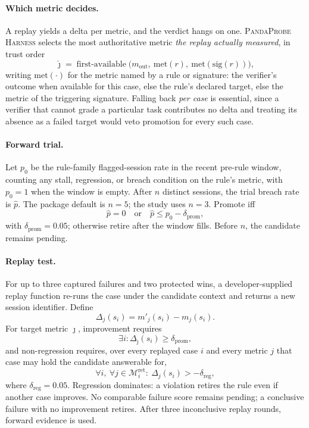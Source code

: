 \documentclass[11pt,letterpaper]{article}
\newcommand{\dpromote}{\delta_{\mathrm{prom}}}
\newcommand{\dregress}{\delta_{\mathrm{reg}}}
\newcommand{\Harness}{\textsc{PandaProbe Harness}\xspace}
\newcommand{\Mset}{\mathcal{M}}
\newcommand{\outcome}{m_{\mathrm{out}}}
\begin{document}
\paragraph{Which metric decides.}
A replay yields a delta per metric, and the verdict hangs on one. \Harness selects the most
authoritative metric \emph{the replay actually measured}, in trust order
\begin{equation}
 \hat\jmath=\operatorname{first-available}\bigl(\outcome,\ \mathrm{met}(r),\
 \mathrm{met}(\mathrm{sig}(r))\bigr),
 \label{eq:target}
\end{equation}
writing $\mathrm{met}(\cdot)$ for the metric named by a rule or signature: the verifier's outcome
when available for this case, else the rule's declared target, else the metric of the triggering
signature. Falling back \emph{per case} is essential, since a verifier that cannot grade a
particular task contributes no delta and treating its absence as a failed target would veto
promotion for every such case.

\paragraph{Forward trial.}
Let $p_0$ be the rule-family flagged-session rate in the recent pre-rule window, counting any
stall, regression, or breach condition on the rule's metric, with $p_0{=}1$ when the window is
empty. After $n$ distinct sessions, the trial breach rate is $\hat p$. The package
default is $n{=}5$; the study uses $n{=}3$. Promote iff
\begin{equation}
 \hat p=0\quad\text{or}\quad\hat p\le p_0-\dpromote,
 \label{eq:forward}
\end{equation}
with $\dpromote{=}0.05$; otherwise retire after the window fills. Before $n$, the candidate remains
pending.

\paragraph{Replay test.}
For up to three captured failures and two protected wins, a developer-supplied replay function
re-runs the case under the candidate context and returns a new session identifier. Define
\begin{equation}
 \Delta_j(s_i)=m'_j(s_i)-m_j(s_i).
 \label{eq:delta}
\end{equation}
For target metric $\hat\jmath$, improvement requires
\begin{equation}
 \exists i:\Delta_{\hat\jmath}(s_i)\ge\dpromote,
 \label{eq:improve}
\end{equation}
and non-regression requires, over every replayed case $i$ and every metric $j$ that case may hold
the candidate answerable for,
\begin{equation}
 \forall i,\ \forall j\in\Mset^{\mathrm{ret}}_i:\ \Delta_j(s_i)>-\dregress,
 \label{eq:noregress}
\end{equation}
where $\dregress{=}0.05$. Regression dominates: a violation retires the rule even if another case
improves. No comparable failure score remains pending; a conclusive failure with no improvement
retires. After three inconclusive replay rounds, forward evidence is used.
\end{document}
